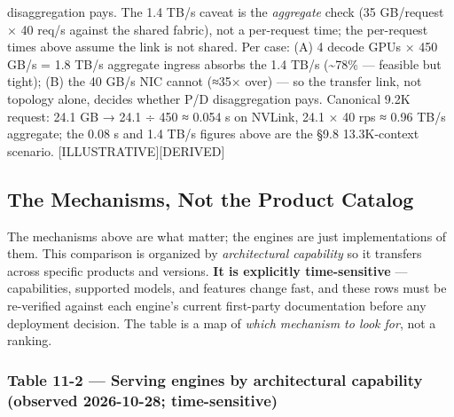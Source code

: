 disaggregation pays. The 1.4 TB/s caveat is the \emph{aggregate} check
(35 GB/request × 40 req/s against the shared fabric), not a per-request
time; the per-request times above assume the link is not shared. Per
case: (A) 4 decode GPUs × 450 GB/s = 1.8 TB/s aggregate ingress absorbs
the 1.4 TB/s (\textasciitilde78\% --- feasible but tight); (B) the 40
GB/s NIC cannot (≈35× over) --- so the transfer link, not topology
alone, decides whether P/D disaggregation pays. Canonical 9.2K request:
24.1 GB → 24.1 ÷ 450 ≈ 0.054 s on NVLink, 24.1 × 40 rps ≈ 0.96 TB/s
aggregate; the 0.08 s and 1.4 TB/s figures above are the §9.8
13.3K-context scenario. \mbox{{[}ILLUSTRATIVE{]}}\hspace{0pt}\mbox{{[}DERIVED{]}}

\subsection{The Mechanisms, Not the Product
Catalog}\label{the-mechanisms-not-the-product-catalog}

The mechanisms above are what matter; the engines are just
implementations of them. This comparison is organized by
\emph{architectural capability} so it transfers across specific products
and versions. \textbf{It is explicitly time-sensitive} --- capabilities,
supported models, and features change fast, and these rows must be
re-verified against each engine's current first-party documentation
before any deployment decision. The table is a map of \emph{which
mechanism to look for}, not a ranking.

\subsubsection{Table 11-2 --- Serving engines by architectural
capability (observed 2026-10-28;
time-sensitive)}\label{table-11-2-serving-engines-by-architectural-capability-observed-2026-10-28-time-sensitive}

